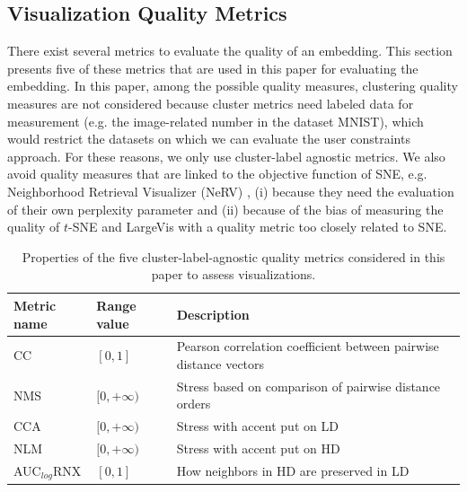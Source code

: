 \subsection{Visualization Quality Metrics}\label{subsec:qual_metrics_background}

There exist several metrics to evaluate the quality of an embedding. This section presents five of these metrics that are used in this paper for evaluating the embedding. 
In this paper, among the possible quality measures, clustering quality measures are not considered because cluster metrics need labeled data for measurement (e.g. the image-related number in the dataset MNIST), which would restrict the datasets on which we can evaluate the user constraints approach.
For these reasons, we only use cluster-label agnostic metrics.
We also avoid quality measures that are linked to the objective function of SNE, e.g. Neighborhood Retrieval Visualizer (NeRV) \cite{venna2010}, (i) because they need the evaluation of their own perplexity parameter and (ii) because of the bias of measuring the quality of $t$-SNE and LargeVis with a quality metric too closely related to SNE.

\begin{table}%
\caption{Properties of the five cluster-label-agnostic quality metrics considered in this paper to assess visualizations.}\label{tab:metrics}
\begin{tabular}{p{1.5cm} p{0.8cm} p{4.5cm}}
\toprule
Metric name &  Range value & Description\\
\midrule
CC & $[0, 1]$ & Pearson correlation coefficient between pairwise distance vectors\\
NMS & $[0, +\infty)$ & Stress based on comparison of pairwise distance orders\\
CCA & $[0, +\infty)$ & Stress with accent put on LD\\
NLM & $[0, +\infty)$ & Stress with accent put on HD\\
AUC$_{log}$RNX & $[0, 1]$ & How neighbors in HD are preserved in LD\\
\bottomrule
\end{tabular}
\end{table}

